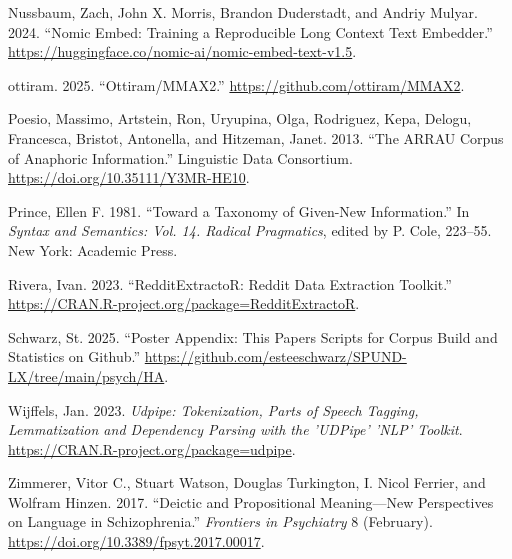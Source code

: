 \documentclass[
  12pt,
  oneside]{book}
\newlength{\cslhangindent}
\newenvironment{CSLReferences}[2] %
 {\begin{list}{}{%
  \setlength{\itemindent}{0pt}
  \setlength{\leftmargin}{0pt}
  \setlength{\parsep}{0pt}
  \ifodd #1
   \setlength{\leftmargin}{\cslhangindent}
   \setlength{\itemindent}{-1\cslhangindent}
  \fi
  \setlength{\itemsep}{#2\baselineskip}}}
 {\end{list}}
\begin{document}
\begin{CSLReferences}{1}{0}
Nussbaum, Zach, John X. Morris, Brandon Duderstadt, and Andriy Mulyar. 2024. {``Nomic {Embed}: {Training} a {Reproducible} {Long} {Context} {Text} {Embedder}.''} \url{https://huggingface.co/nomic-ai/nomic-embed-text-v1.5}.

ottiram. 2025. {``Ottiram/{MMAX2}.''} \url{https://github.com/ottiram/MMAX2}.

Poesio, Massimo, Artstein, Ron, Uryupina, Olga, Rodriguez, Kepa, Delogu, Francesca, Bristot, Antonella, and Hitzeman, Janet. 2013. {``The {ARRAU} {Corpus} of {Anaphoric} {Information}.''} Linguistic Data Consortium. \url{https://doi.org/10.35111/Y3MR-HE10}.

Prince, Ellen F. 1981. {``Toward a Taxonomy of Given-New Information.''} In \emph{Syntax and Semantics: {Vol}. 14. {Radical} {Pragmatics}}, edited by P. Cole, 223--55. New York: Academic Press.

Rivera, Ivan. 2023. {``{RedditExtractoR}: {Reddit} {Data} {Extraction} {Toolkit}.''} \url{https://CRAN.R-project.org/package=RedditExtractoR}.

Schwarz, St. 2025. {``Poster Appendix: This Papers Scripts for Corpus Build and Statistics on Github.''} \url{https://github.com/esteeschwarz/SPUND-LX/tree/main/psych/HA}.

Wijffels, Jan. 2023. \emph{Udpipe: {Tokenization}, {Parts} of {Speech} {Tagging}, {Lemmatization} and {Dependency} {Parsing} with the '{UDPipe}' '{NLP}' {Toolkit}}. \url{https://CRAN.R-project.org/package=udpipe}.

Zimmerer, Vitor C., Stuart Watson, Douglas Turkington, I. Nicol Ferrier, and Wolfram Hinzen. 2017. {``Deictic and {Propositional} {Meaning}---{New} {Perspectives} on {Language} in {Schizophrenia}.''} \emph{Frontiers in Psychiatry} 8 (February). \url{https://doi.org/10.3389/fpsyt.2017.00017}.

\end{CSLReferences}
\end{document}
